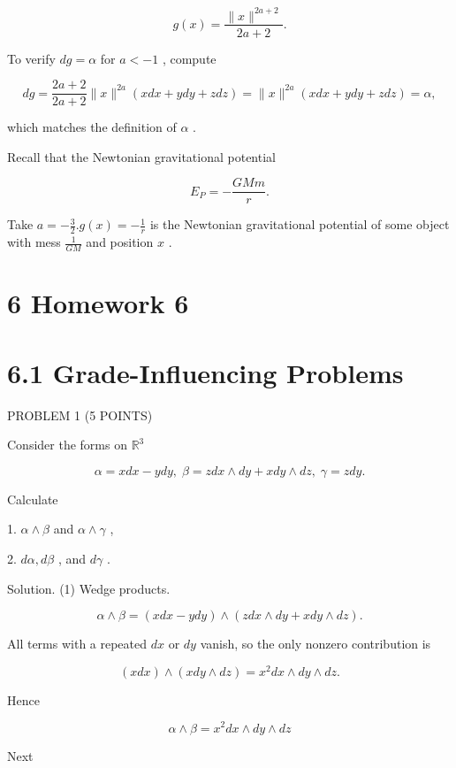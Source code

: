 \documentclass[10pt]{article}
\begin{document}
\[
g\left( x\right)  = \frac{\parallel x{\parallel }^{{2a} + 2}}{{2a} + 2}. \tag{1}
\]

To verify \({dg} = \alpha\) for \(a <  - 1\) , compute

\[
{dg} = \frac{{2a} + 2}{{2a} + 2}\parallel x{\parallel }^{2a}\left( {{xdx} + {ydy} + {zdz}}\right)  = \parallel x{\parallel }^{2a}\left( {{xdx} + {ydy} + {zdz}}\right)  = \alpha ,
\]

which matches the definition of \(\alpha\) .

Recall that the Newtonian gravitational potential

\[
{E}_{P} =  - \frac{GMm}{r}.
\]

Take \(a =  - \frac{3}{2}.g\left( x\right)  =  - \frac{1}{r}\) is the Newtonian gravitational potential of some object with mess \(\frac{1}{GM}\) and position \(x\) .

\section*{6 Homework 6}

\section*{6.1 Grade-Influencing Problems}

PROBLEM 1 (5 POINTS)

Consider the forms on \({\mathbb{R}}^{3}\)

\[
\alpha  = {xdx} - {ydy},\;\beta  = {zdx} \land  {dy} + {xdy} \land  {dz},\;\gamma  = {zdy}.
\]

Calculate

1. \(\alpha  \land  \beta\) and \(\alpha  \land  \gamma\) ,

2. \({d\alpha },{d\beta }\) , and \({d\gamma }\) .

Solution. (1) Wedge products.

\[
\alpha  \land  \beta  = \left( {{xdx} - {ydy}}\right)  \land  \left( {{zdx} \land  {dy} + {xdy} \land  {dz}}\right) .
\]

All terms with a repeated \({dx}\) or \({dy}\) vanish, so the only nonzero contribution is

\[
\left( {xdx}\right)  \land  \left( {{xdy} \land  {dz}}\right)  = {x}^{2}{dx} \land  {dy} \land  {dz}.
\]

Hence

\[
\alpha  \land  \beta  = {x}^{2}{dx} \land  {dy} \land  {dz}
\]

Next
\end{document}
